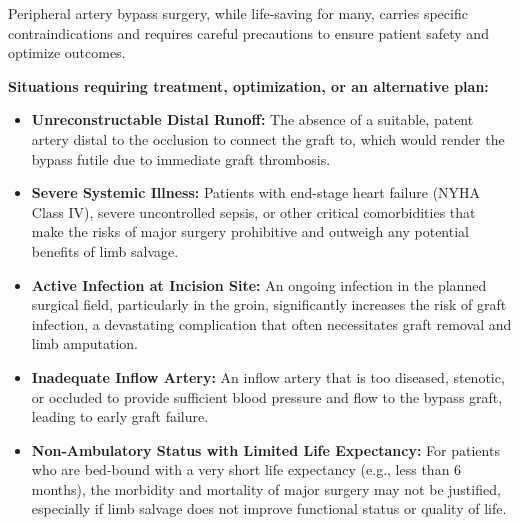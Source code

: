 Peripheral artery bypass surgery, while life-saving for many, carries specific contraindications and requires careful precautions to ensure patient safety and optimize outcomes.

\textbf{Situations requiring treatment, optimization, or an alternative plan:}
\begin{itemize}
  \item \textbf{Unreconstructable Distal Runoff:} The absence of a suitable, patent artery distal to the occlusion to connect the graft to, which would render the bypass futile due to immediate graft thrombosis.
  
  \item \textbf{Severe Systemic Illness:} Patients with end-stage heart failure (NYHA Class IV), severe uncontrolled sepsis, or other critical comorbidities that make the risks of major surgery prohibitive and outweigh any potential benefits of limb salvage.
  
  \item \textbf{Active Infection at Incision Site:} An ongoing infection in the planned surgical field, particularly in the groin, significantly increases the risk of graft infection, a devastating complication that often necessitates graft removal and limb amputation.
  
  \item \textbf{Inadequate Inflow Artery:} An inflow artery that is too diseased, stenotic, or occluded to provide sufficient blood pressure and flow to the bypass graft, leading to early graft failure.
  
  \item \textbf{Non-Ambulatory Status with Limited Life Expectancy:} For patients who are bed-bound with a very short life expectancy (e.g., less than 6 months), the morbidity and mortality of major surgery may not be justified, especially if limb salvage does not improve functional status or quality of life.
\end{itemize}

